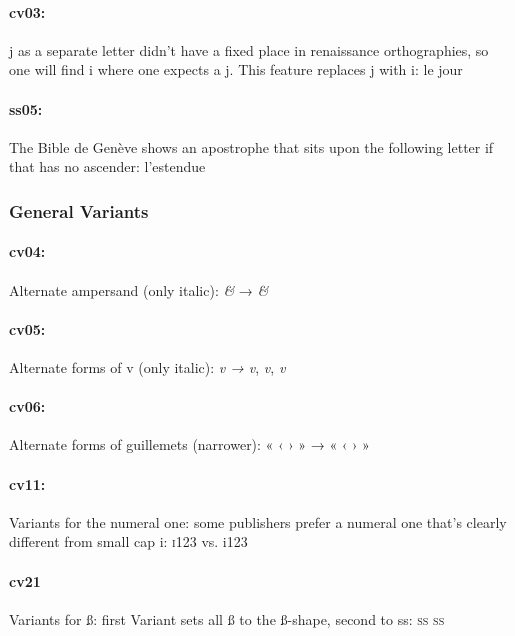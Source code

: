 \documentclass[pagesize,DIV14]{scrartcl}
\begin{document}
\paragraph*{cv03:} j as a separate letter didn’t have a fixed place  in renaissance orthographies, so one will find i where one expects a j. This feature replaces j with i: {le jour}
\paragraph*{ss05:} The Bible de Genève shows an apostrophe that sits upon the following letter if that has no ascender: {l’estendue}

\subsubsection{General Variants}

\paragraph*{cv04:} Alternate ampersand (only italic): \textit{\&} → \textit{\&}

\paragraph*{cv05:} Alternate forms of v (only italic): 
\textit{v → {v}}, \textit{v}, \textit{v}

\paragraph*{cv06:} Alternate forms of guillemets (narrower): « ‹ › » → {« ‹ › »}

\paragraph*{cv11:} Variants for the numeral one: some publishers prefer a numeral one that’s clearly different from small cap i: \textsc{i123} vs. {i123}

\paragraph*{cv21} Variants for ß: first Variant sets all ß to the ß-shape, second to ss: \textsc{{ß} {ß}}
\end{document}
